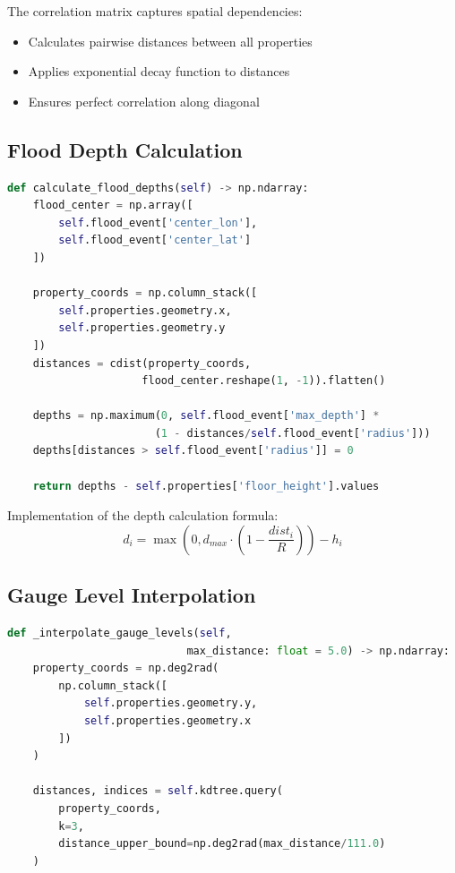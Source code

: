 \documentclass{article}
\begin{document}
The correlation matrix captures spatial dependencies:
\begin{itemize}
    \item Calculates pairwise distances between all properties
    \item Applies exponential decay function to distances
    \item Ensures perfect correlation along diagonal
\end{itemize}

\subsection{Flood Depth Calculation}
\begin{lstlisting}[language=Python]
def calculate_flood_depths(self) -> np.ndarray:
    flood_center = np.array([
        self.flood_event['center_lon'],
        self.flood_event['center_lat']
    ])
    
    property_coords = np.column_stack([
        self.properties.geometry.x,
        self.properties.geometry.y
    ])
    distances = cdist(property_coords, 
                     flood_center.reshape(1, -1)).flatten()
    
    depths = np.maximum(0, self.flood_event['max_depth'] * 
                       (1 - distances/self.flood_event['radius']))
    depths[distances > self.flood_event['radius']] = 0
    
    return depths - self.properties['floor_height'].values
\end{lstlisting}

Implementation of the depth calculation formula:
\begin{equation}
d_i = \max(0, d_{max} \cdot (1 - \frac{dist_i}{R})) - h_i
\end{equation}

\subsection{Gauge Level Interpolation}
\begin{lstlisting}[language=Python]
def _interpolate_gauge_levels(self, 
                            max_distance: float = 5.0) -> np.ndarray:
    property_coords = np.deg2rad(
        np.column_stack([
            self.properties.geometry.y,
            self.properties.geometry.x
        ])
    )
    
    distances, indices = self.kdtree.query(
        property_coords,
        k=3,
        distance_upper_bound=np.deg2rad(max_distance/111.0)
    )
\end{lstlisting}
\end{document}
